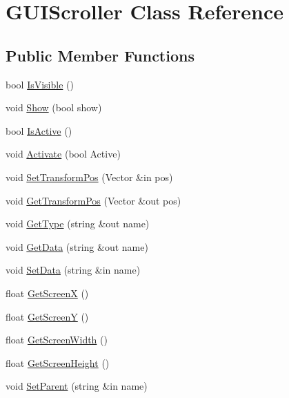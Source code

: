 \hypertarget{class_g_u_i_scroller}{}\section{G\+U\+I\+Scroller Class Reference}
\label{class_g_u_i_scroller}
\subsection*{Public Member Functions}
\begin{DoxyCompactItemize}
\item 
bool \hyperlink{class_g_u_i_scroller_aaac31becef8538d7e5565766825674b8}{Is\+Visible} ()
\item 
void \hyperlink{class_g_u_i_scroller_a6700ed07ffb74193eb92e07f4d4fbe79}{Show} (bool show)
\item 
bool \hyperlink{class_g_u_i_scroller_a7c57d7d1f5b2e15ac6c242a53a3425b0}{Is\+Active} ()
\item 
void \hyperlink{class_g_u_i_scroller_ac6b445a1c8683252abffd068e863992a}{Activate} (bool Active)
\item 
void \hyperlink{class_g_u_i_scroller_adff9bfd02390c6fd5aa07956a6146bf8}{Set\+Transform\+Pos} (Vector \&in pos)
\item 
void \hyperlink{class_g_u_i_scroller_a4c09399d7d12ef27d0a2079b2cd7bce3}{Get\+Transform\+Pos} (Vector \&out pos)
\item 
void \hyperlink{class_g_u_i_scroller_ab7154e6dd37f538cc44db9973f88f08d}{Get\+Type} (string \&out name)
\item 
void \hyperlink{class_g_u_i_scroller_af03e01fed089504cf970eeedaceb53c7}{Get\+Data} (string \&out name)
\item 
void \hyperlink{class_g_u_i_scroller_a8800d0be5c1b9e16d5e20c583ceb5735}{Set\+Data} (string \&in name)
\item 
float \hyperlink{class_g_u_i_scroller_a81ca8fa869688a11e4ddaed7ae1d8853}{Get\+ScreenX} ()
\item 
float \hyperlink{class_g_u_i_scroller_aef60f9e24061559b2bc5db477fc174a5}{Get\+ScreenY} ()
\item 
float \hyperlink{class_g_u_i_scroller_a59da17b023aae3a7343503a83b7f9f8d}{Get\+Screen\+Width} ()
\item 
float \hyperlink{class_g_u_i_scroller_a1b58f3c2e3cfc08c8cbceb8ce37096ea}{Get\+Screen\+Height} ()
\item 
void \hyperlink{class_g_u_i_scroller_a0fb5b8d6c5a6260a79f916b8283c024a}{Set\+Parent} (string \&in name)

\end{DoxyCompactItemize}
